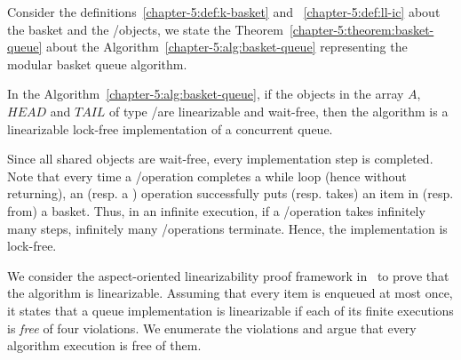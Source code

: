 Consider the definitions~\ref{chapter-5:def:k-basket} and ~\ref{chapter-5:def:ll-ic} about the basket and the \LL/\IC objects, we state the Theorem~\ref{chapter-5:theorem:basket-queue} about the Algorithm~\ref{chapter-5:alg:basket-queue} representing the modular basket queue algorithm.

\begin{theorem}\label{chapter-5:theorem:basket-queue}

  In the Algorithm~\ref{chapter-5:alg:basket-queue}, if the objects in the array \(A\), \(HEAD\) and \(TAIL\) of type \LL/\IC are linearizable and wait-free, then the algorithm is a linearizable lock-free implementation of a concurrent queue.
\end{theorem}

\begin{proofT}
  Since all shared objects are wait-free, every implementation step is completed. Note that every time a \Deq/\Enq operation completes a while loop (hence without returning), an \Enq (resp. a \Deq) operation successfully puts (resp. takes) an item in (resp. from) a basket. Thus, in an infinite execution, if a \Deq/\Enq operation takes infinitely many steps, infinitely many \Deq/\Enq operations terminate. Hence, the implementation is lock-free.

  We consider the aspect-oriented linearizability proof framework in~\cite{DBLP_conf_concur_HenzingerSV13} to prove that the algorithm is linearizable. Assuming that every item is enqueued at most once, it states that a queue implementation is linearizable if each of its finite executions is \emph{free} of four violations. We enumerate the violations and argue that every algorithm execution is free of them.


\end{proofT}
